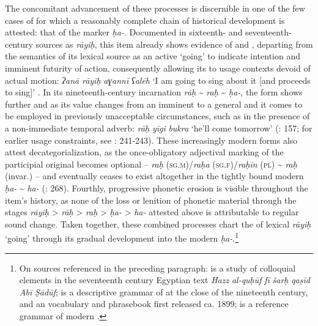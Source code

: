 \documentclass[output=paper]{langsci/langscibook}
\begin{document}
The concomitant advancement of these processes is discernible in one of the few cases of   for which a reasonably complete chain of historical development is attested: that of the    marker \textit{ḥ}\textit{a-}. Documented in sixteenth- and seventeenth-century sources as \textit{rāy}\textit{iḥ}, this item already shows evidence of  and , departing from the semantics of its lexical source as an active  ‘going’ to indicate intention and imminent futurity of action, consequently allowing its  to usage contexts devoid of actual motion: \textit{ʔan}\textit{ā} \textit{r}\textit{āyi}\textit{ḥ} \textit{aɣannī} \textit{ʕalēh} ‘I am going to sing about it [and proceeds to sing]’ \citep[241]{Davies1981}. In its nineteenth-century incarnation \textit{rāḥ} {\textasciitilde} \textit{raḥ} {\textasciitilde} \textit{ḥa-}, the form shows further  and  as its value changes from an imminent to a general  and it comes to be employed in previously unacceptable circumstances, such as in the presence of a non-immediate temporal adverb: \textit{rāḥ} \textit{yīgi} \textit{bukra} ‘he’ll come tomorrow’ (\citealt{Elias1981}: 157; for earlier usage constraints, see \citealt{Davies1981}: 241-243). These increasingly modern forms also attest decategorialization, as the once-obligatory adjectival  marking of the participial original becomes optional – \textit{raḥ} (\textsc{sg.m})/\textit{raḥ}\textit{a} (\textsc{sg.f})/\textit{raḥī}\textit{n} (\textsc{pl}) {\textasciitilde} \textit{raḥ} (invar.) \citep[40]{Vollers1895} – and eventually ceases to exist altogether in the tightly bound modern  \textit{ḥa-} {\textasciitilde} \textit{ha-} (\citealt{Abdel-Massih2009}: 268). Fourthly, progressive phonetic erosion is visible throughout the item’s history, as none of the loss or lenition of phonetic material through the stages \textit{rāyiḥ} > \textit{rāḥ} > \textit{raḥ} > \textit{ḥa-} > \textit{ha-} attested above is attributable to regular sound change. Taken together, these combined processes chart the  of lexical \textit{rāyiḥ} ‘going’ through its gradual development into the modern    \textit{ḥa-}.\footnote{On sources referenced in the preceding paragraph: \citet{Davies1981} is a study of colloquial elements in the seventeenth century Egyptian text \textit{Hazz} \textit{al-quḥūf} \textit{fī} \textit{šarḥ} \textit{qaṣīd} \textit{Abī} \textit{Ṣādūf}; \citet{Vollers1895} is a descriptive grammar of  at the close of the nineteenth century, and \citet{Elias1981} an \textendash {} vocabulary and phrasebook first released ca. 1899;  \citet{Abdel-Massih2009} is a reference grammar of modern .}
\end{document}
